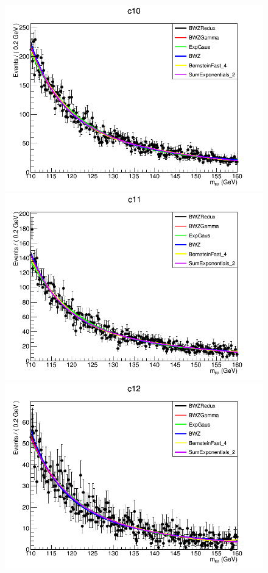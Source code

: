 \begin{figure}[hbp]
  \centering
  \includegraphics[width=0.65\linewidth]{figures/ch_higgs/backgroundmodel/uf_bdt/backgroundFits__c10__bkgModels.png}\\
  \includegraphics[width=0.65\linewidth]{figures/ch_higgs/backgroundmodel/uf_bdt/backgroundFits__c11__bkgModels.png}\\
  \includegraphics[width=0.65\linewidth]{figures/ch_higgs/backgroundmodel/uf_bdt/backgroundFits__c12__bkgModels.png}
  \caption{}
  \label{fig:higgs_bmodel_bdtc10c12}
\end{figure}